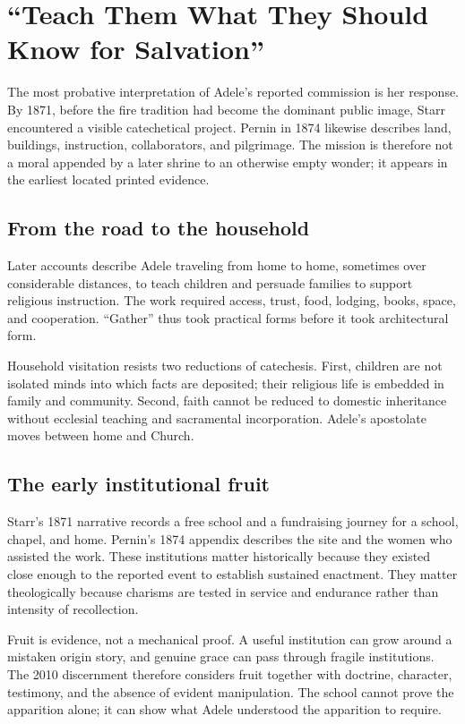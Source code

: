 \section{“Teach Them What They Should Know for Salvation”}

The most probative interpretation of Adele's reported commission is her response. By 1871, before the fire tradition had become the dominant public image, Starr encountered a visible catechetical project. Pernin in 1874 likewise describes land, buildings, instruction, collaborators, and pilgrimage. The mission is therefore not a moral appended by a later shrine to an otherwise empty wonder; it appears in the earliest located printed evidence.

\subsection{From the road to the household}

Later accounts describe Adele traveling from home to home, sometimes over considerable distances, to teach children and persuade families to support religious instruction. The work required access, trust, food, lodging, books, space, and cooperation. “Gather” thus took practical forms before it took architectural form.

Household visitation resists two reductions of catechesis. First, children are not isolated minds into which facts are deposited; their religious life is embedded in family and community. Second, faith cannot be reduced to domestic inheritance without ecclesial teaching and sacramental incorporation. Adele's apostolate moves between home and Church.

\subsection{The early institutional fruit}

Starr's 1871 narrative records a free school and a fundraising journey for a school, chapel, and home. Pernin's 1874 appendix describes the site and the women who assisted the work. These institutions matter historically because they existed close enough to the reported event to establish sustained enactment. They matter theologically because charisms are tested in service and endurance rather than intensity of recollection.

Fruit is evidence, not a mechanical proof. A useful institution can grow around a mistaken origin story, and genuine grace can pass through fragile institutions. The 2010 discernment therefore considers fruit together with doctrine, character, testimony, and the absence of evident manipulation. The school cannot prove the apparition alone; it can show what Adele understood the apparition to require.

